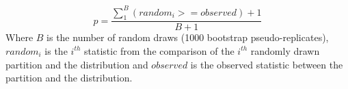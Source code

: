\documentclass[a4paper,11pt]{article}
\begin{document}
\begin{equation}
    p=\frac{\sum_1^B\left(random_{i} >= observed\right)+1}{B + 1}
\end{equation}
\noindent Where $B$ is the number of random draws (1000 bootstrap pseudo-replicates), $random_{i}$ is the $i^{th}$ statistic from the comparison of the $i^{th}$ randomly drawn partition and the distribution and $observed$ is the observed statistic between the partition and the distribution.
\end{document}
